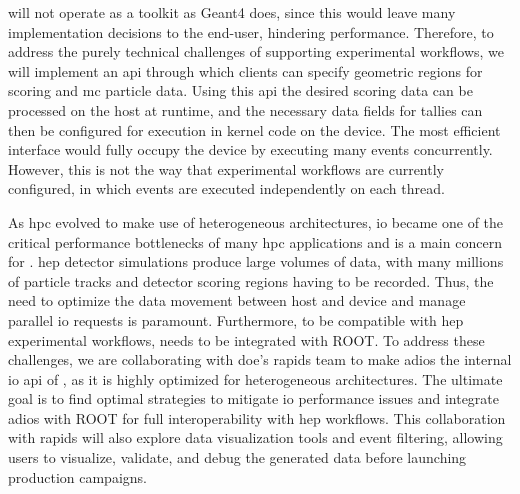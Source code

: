 \celeritas will not operate as a toolkit as Geant4 does, since this would leave
many implementation decisions to the end-user, hindering performance. Therefore,
to address the purely technical challenges of supporting experimental workflows,
we will implement an \ac{api} through which clients can specify geometric
regions for scoring and \ac{mc} particle data. Using this \ac{api} the desired
scoring data can be processed on the host at runtime, and the necessary data
fields for tallies can then be configured for execution in kernel code on the
device.  The most efficient interface would fully occupy the device by executing
many events concurrently.  However, this is not the way that experimental
workflows are currently configured, in which events are executed independently
on each thread.

As \ac{hpc} evolved to make use of heterogeneous architectures, \ac{io} became
one of the critical performance bottlenecks of many \ac{hpc} applications and is
a main concern for \celeritas. \ac{hep} detector simulations produce large
volumes of data, with many millions of particle tracks and detector scoring
regions having to be recorded. Thus, the need to optimize the data movement
between host and device and manage parallel \ac{io} requests is paramount.
Furthermore, to be compatible with \ac{hep} experimental workflows, \celeritas
needs to be integrated with ROOT. To address these challenges, we are
collaborating with \ac{doe}'s \ac{rapids} team to make \ac{adios} the internal
\ac{io} \ac{api} of \celeritas, as it is highly optimized for heterogeneous
architectures. The ultimate goal is to find optimal strategies to mitigate
\ac{io} performance issues and integrate \ac{adios} with ROOT for full
interoperability with \ac{hep} workflows. This collaboration with \ac{rapids}
will also explore data visualization tools and event filtering, allowing users
to visualize, validate, and debug the generated data before launching production
campaigns.
